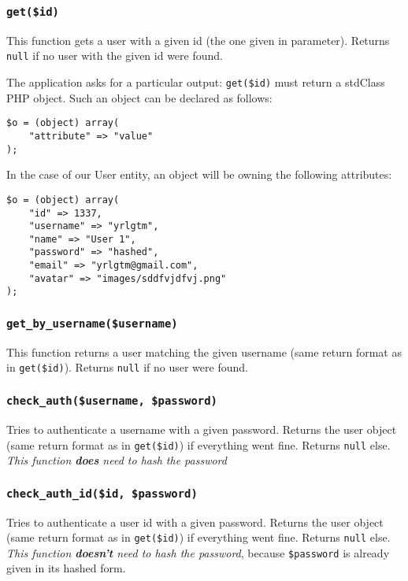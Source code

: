 \documentclass[twoside,a4paper,12pt]{article}
\begin{document}
\subsubsection{\texttt{get(\$id)}}
This function gets a user with a given id (the one given in parameter). Returns \texttt{null} if no user with the given id were found.

The application asks for a particular output: \texttt{get(\$id)} must return a stdClass PHP object. Such an object can be declared as follows:

\begin{lstlisting}
$o = (object) array(
	"attribute" => "value"
);
\end{lstlisting}

In the case of our User entity, an object will be owning the following attributes:

\begin{lstlisting}
$o = (object) array(
    "id" => 1337,
    "username" => "yrlgtm",
    "name" => "User 1",
    "password" => "hashed",
    "email" => "yrlgtm@gmail.com",
    "avatar" => "images/sddfvjdfvj.png" 
);
\end{lstlisting}

\subsubsection{\texttt{get\_by\_username(\$username)}}
This function returns a user matching the given username (same return format as in \texttt{get(\$id)}). Returns \texttt{null} if no user were found.

\subsubsection{\texttt{check\_auth(\$username, \$password)}}
Tries to authenticate a username with a given password. Returns the user object (same return format as in \texttt{get(\$id)}) if everything went fine. Returns \texttt{null} else. \textit{This function \textbf{does} need to hash the password}

\subsubsection{\texttt{check\_auth\_id(\$id, \$password)}}
Tries to authenticate a user id with a given password. Returns the user object (same return format as in \texttt{get(\$id)}) if everything went fine. Returns \texttt{null} else. \textit{This function \textbf{doesn't} need to hash the password}, because \texttt{\$password} is already given in its hashed form.
\end{document}
